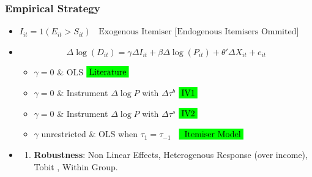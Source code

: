\documentclass[options]{beamer}
\newcommand{\highlight}[1]{\colorbox{green}{\ensuremath{#1}}}
\begin{document}
\begin{frame}
	\frametitle{Empirical Strategy}
	\begin{itemize}
		\footnotesize
		
		\item[]  $I_{it}=1(E_{it}>S_{it})$ $\;\;\textrm{Exogenous Itemiser [Endogenous Itemisers Ommited]}$
		
		\item[] \begin{equation*}\Delta\log(D_{it})= \gamma \Delta I_{it}+\beta\Delta \log(P_{it}) + \theta'\Delta X_{it}+ e_{it} \end{equation*}
			\normalsize	
				
	
		\vspace{2pt}
			\hrulefill 
		\begin{itemize}
			\item[(1)] $\gamma=0$ \& OLS $\highlight{\textrm{Literature}}$
		\vspace{5pt}
				\item[(2)] $\gamma=0$ \& Instrument $\Delta \log P$ with $\Delta \tau^b$ $\highlight{\textrm{IV1}}$
						\vspace{5pt}
							\item[(3)] $\gamma=0$ \& Instrument $\Delta \log P$ with $\Delta \tau^s$ $\highlight{\textrm{IV2}}$
							\vspace{5pt}
			\item[(4)] $\gamma $ unrestricted   \& OLS when $\tau_1=\tau_{-1}$ $\;\;  \highlight{\textrm{ Itemiser Model}}$
		\end{itemize}
		

			\hrulefill 
		\item[] 	\begin{enumerate}
		

		\vspace{10pt}
		
		\item[] \textbf{Robustness}: Non Linear Effects, Heterogenous Response (over income), Tobit , Within Group.
		\end{enumerate}
		
	\end{itemize}
\end{frame}
\end{document}
